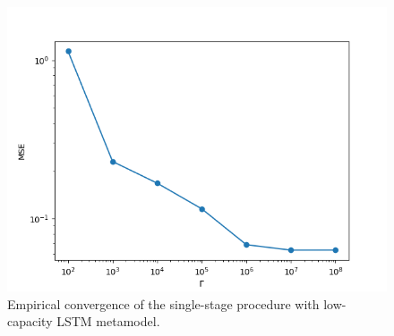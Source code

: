 \documentclass{article}
\begin{document}
\begin{figure}[ht!]
    \centering
    \includegraphics[width=\textwidth]{./figures/singleStage/mseConvergence.png}
    \caption{Empirical convergence of the single-stage procedure with low-capacity LSTM metamodel.} 
    \label{fig:gammaConvergence}
\end{figure}
\end{document}
